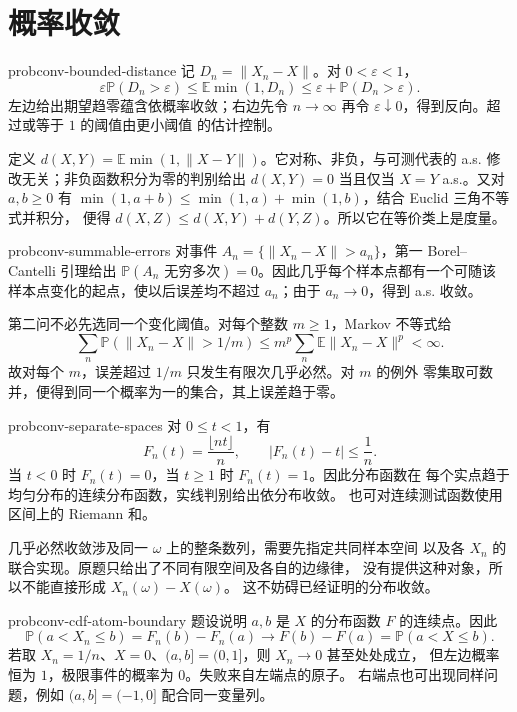 \chapter{概率收敛}

\begin{solution}{probconv-bounded-distance}
记 $D_n=\|X_n-X\|$。对 $0<\varepsilon<1$，
\[
 \varepsilon\mathbb P(D_n>\varepsilon)
 \le\mathbb E\min(1,D_n)
 \le\varepsilon+\mathbb P(D_n>\varepsilon).
\]
左边给出期望趋零蕴含依概率收敛；右边先令 $n\to\infty$ 再令
$\varepsilon\downarrow0$，得到反向。超过或等于 $1$ 的阈值由更小阈值
的估计控制。

定义 $d(X,Y)=\mathbb E\min(1,\|X-Y\|)$。它对称、非负，与可测代表的
a.s. 修改无关；非负函数积分为零的判别给出 $d(X,Y)=0$ 当且仅当
$X=Y$ a.s.。又对 $a,b\ge0$ 有
$\min(1,a+b)\le\min(1,a)+\min(1,b)$，结合 Euclid 三角不等式并积分，
便得 $d(X,Z)\le d(X,Y)+d(Y,Z)$。所以它在等价类上是度量。
\end{solution}

\begin{solution}{probconv-summable-errors}
对事件 $A_n=\{\|X_n-X\|>a_n\}$，第一 Borel--Cantelli 引理给出
$\mathbb P(A_n\text{ 无穷多次})=0$。因此几乎每个样本点都有一个可随该
样本点变化的起点，使以后误差均不超过 $a_n$；由于 $a_n\to0$，得到
a.s. 收敛。

第二问不必先选同一个变化阈值。对每个整数 $m\ge1$，Markov 不等式给
\[
 \sum_n\mathbb P(\|X_n-X\|>1/m)
 \le m^p\sum_n\mathbb E\|X_n-X\|^p<\infty.
\]
故对每个 $m$，误差超过 $1/m$ 只发生有限次几乎必然。对 $m$ 的例外
零集取可数并，便得到同一个概率为一的集合，其上误差趋于零。
\end{solution}

\begin{solution}{probconv-separate-spaces}
对 $0\le t<1$，有
\[
 F_n(t)=\frac{\lfloor nt\rfloor}{n},\qquad
 |F_n(t)-t|\le\frac1n.
\]
当 $t<0$ 时 $F_n(t)=0$，当 $t\ge1$ 时 $F_n(t)=1$。因此分布函数在
每个实点趋于均匀分布的连续分布函数，实线判别给出依分布收敛。
也可对连续测试函数使用区间上的 Riemann 和。

几乎必然收敛涉及同一 $\omega$ 上的整条数列，需要先指定共同样本空间
以及各 $X_n$ 的联合实现。原题只给出了不同有限空间及各自的边缘律，
没有提供这种对象，所以不能直接形成 $X_n(\omega)-X(\omega)$。
这不妨碍已经证明的分布收敛。
\end{solution}

\begin{solution}{probconv-cdf-atom-boundary}
题设说明 $a,b$ 是 $X$ 的分布函数 $F$ 的连续点。因此
\[
 \mathbb P(a<X_n\le b)=F_n(b)-F_n(a)
 \longrightarrow F(b)-F(a)=\mathbb P(a<X\le b).
\]
若取 $X_n=1/n$、$X=0$、$(a,b]=(0,1]$，则 $X_n\to0$ 甚至处处成立，
但左边概率恒为 $1$，极限事件的概率为 $0$。失败来自左端点的原子。
右端点也可出现同样问题，例如 $(a,b]=(-1,0]$ 配合同一变量列。
\end{solution}

